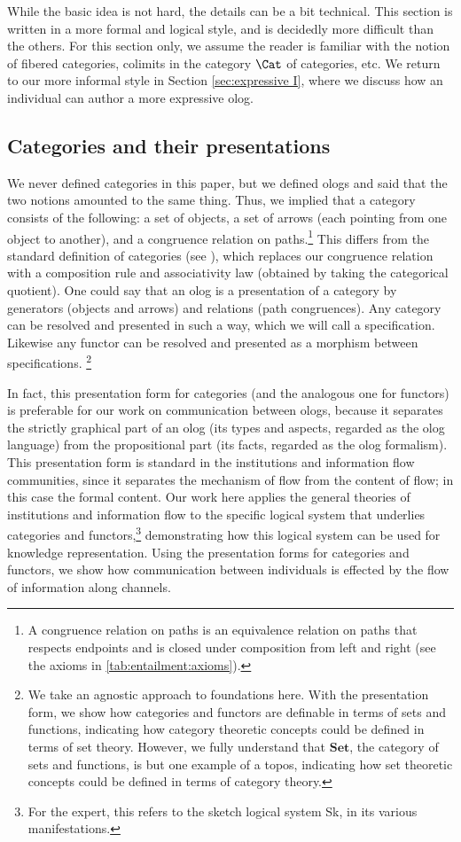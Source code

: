While the basic idea is not hard, the details can be a bit technical. This section is written in a more formal and logical style, and is decidedly more difficult than the others. For this section only, we assume the reader is familiar with the notion of fibered categories, colimits in the category $\Cat$ of categories, etc. We return to our more informal style in Section \ref{sec:expressive I}, where we discuss how an individual can author a more expressive olog.

\subsection{Categories and their presentations}

We never defined categories in this paper, but we defined ologs and said that the two notions amounted to the same thing. Thus, we implied that a category consists of the following: a set of objects, a set of arrows (each pointing from one object to another), and a congruence relation on paths.\footnote{A congruence relation on paths is an equivalence relation on paths
that respects endpoints and is closed under composition from left and right 
(see the axioms in \ref{tab:entailment:axioms}).}
%
This differs from the standard definition of categories (see \cite{Mac}), which replaces
our congruence relation with a composition rule and associativity law (obtained by taking the categorical quotient). One could say that an olog is a presentation of a category by generators (objects and arrows) and relations (path congruences). Any category can be resolved and presented in such a way, which we will call a specification. Likewise any functor can be resolved and presented as a morphism between specifications.
\footnote{We take an agnostic approach to foundations here. 
With the presentation form, we show how categories and functors are definable in terms of sets and functions,
indicating how category theoretic concepts could be defined in terms of set theory. 
However, we fully understand that $\mathbf{Set}$, the category of sets and functions, is but one example of a topos, 
indicating how set theoretic concepts could be defined in terms of category theory.}

In fact, this presentation form for categories (and the analogous one for functors) 
is preferable for our work on communication between ologs, 
because it separates the strictly graphical part of an olog (its types and aspects, regarded as the olog language) 
from the propositional part (its facts, regarded as the olog formalism). 
This presentation form is standard in the institutions \cite{GB:INS} and information flow \cite{BS:IF} communities, 
since it separates the mechanism of flow from the content of flow; in this case the formal content. 
%
Our work here applies the general theories of institutions and information flow to the specific logical system that underlies categories and functors,\footnote{For the expert, this refers to the sketch logical system {\ttfamily Sk}, 
in its various manifestations.}
demonstrating how this logical system can be used for knowledge representation.
Using the presentation forms for categories and functors, we show how communication  between individuals is effected by the flow of information along channels. 

